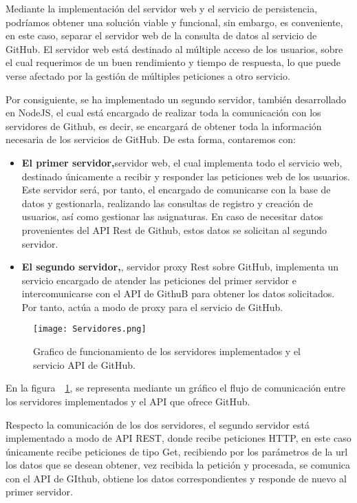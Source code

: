 Mediante la implementación del servidor web y el servicio de persistencia, podríamos obtener una solución viable y funcional, sin embargo, es conveniente, en este caso, separar el servidor web de la consulta de datos al servicio de GitHub. El servidor web está destinado al múltiple acceso de los usuarios, sobre el cual requerimos de un buen rendimiento y tiempo de respuesta, lo que puede verse afectado por la gestión de múltiples peticiones a otro servicio.

Por consiguiente, se ha implementado un segundo servidor, también desarrollado en NodeJS, el cual está encargado de realizar toda la comunicación con los servidores de Github, es decir, se encargará de obtener toda la información necesaria de los servicios de GitHub. De esta forma, contaremos con:
\begin{itemize}
  \item \textbf{El primer servidor,}servidor web, el cual implementa todo el servicio web, destinado únicamente a recibir y responder las peticiones web de los usuarios. Este servidor será, por tanto, el encargado de comunicarse con la base de datos y gestionarla, realizando las consultas de registro y creación de usuarios, así como gestionar las asignaturas. En caso de necesitar datos provenientes del API Rest de Github, estos datos se solicitan al segundo servidor.
  \item \textbf{El segundo servidor,}, servidor proxy Rest sobre GitHub, implementa un servicio encargado de atender las peticiones del primer servidor e intercomunicarse con el API de GithuB para obtener los datos solicitados. Por tanto, actúa a modo de proxy para el servicio de GitHub.


\end{itemize}

\begin{figure}[h!]
  \centerline{\texttt{[image: Servidores.png]}}
  \caption{Grafico de funcionamiento de los servidores implementados y el servicio API de GitHub.}
  \label{figure:servidores}
\end{figure}
En la figura~~\ref{figure:servidores}, se representa mediante un gráfico el flujo de comunicación entre los servidores implementados y el API que ofrece GitHub.

Respecto la comunicación de los dos servidores, el segundo servidor está implementado a modo de API REST, donde recibe peticiones HTTP, en este caso únicamente recibe peticiones de tipo Get, recibiendo por los parámetros de la url los datos que se desean obtener, vez recibida la petición y procesada, se comunica con el API de GIthub, obtiene los datos correspondientes y responde de nuevo al primer servidor.

